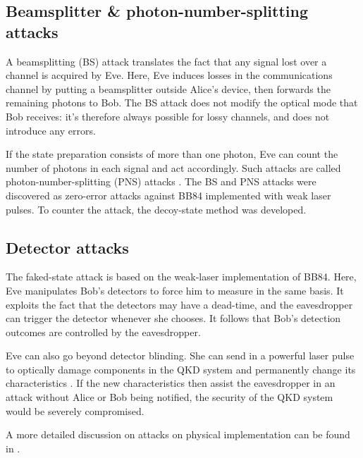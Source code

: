 \subsection{Beamsplitter \& photon-number-splitting attacks}

A beamsplitting (BS) attack translates the fact that any signal lost over a channel is acquired by Eve. Here, Eve induces losses in the communications channel by putting a beamsplitter outside Alice's device, then forwards the remaining photons to Bob. The BS attack does not modify the optical mode that Bob receives: it's therefore always possible for lossy channels, and does not introduce any errors.

If the state preparation consists of more than one photon, Eve can count the number of photons in each signal and act accordingly. Such attacks are called photon-number-splitting (PNS) attacks \cite{bib:PhysRevLett.68.3121}. The BS and PNS attacks were discovered as zero-error attacks against BB84 implemented with weak laser pulses. To counter the attack, the decoy-state method \cite{bib:PhysRevLett.91.057901, bib:PhysRevLett.94.230504} was developed.

\subsection{Detector attacks}

The faked-state attack is based on the weak-laser implementation of BB84. Here, Eve manipulates Bob's detectors to force him to measure in the same basis. It exploits the fact that the detectors may have a dead-time, and the eavesdropper can trigger the detector whenever she chooses. It follows that Bob's detection outcomes are controlled by the eavesdropper.

Eve can also go beyond detector blinding. She can send in a powerful laser pulse to optically damage components in the QKD system and permanently change its characteristics \cite{bib:jain2016attacks}. If the new characteristics then assist the eavesdropper in an attack without Alice or Bob being notified, the security of the QKD system would be severely compromised.

A more detailed discussion on attacks on physical implementation can be found in \cite{bib:jain2016attacks}.